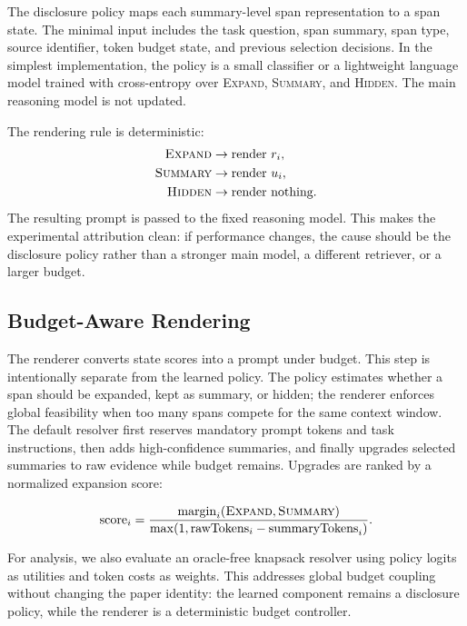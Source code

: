 \documentclass[11pt]{article}
\newcommand{\expandact}{\textsc{Expand}}
\newcommand{\summaryact}{\textsc{Summary}}
\newcommand{\hiddenact}{\textsc{Hidden}}
\begin{document}
The disclosure policy maps each summary-level span representation to a span state. The minimal input includes the task question, span summary, span type, source identifier, token budget state, and previous selection decisions. In the simplest implementation, the policy is a small classifier or a lightweight language model trained with cross-entropy over \expandact{}, \summaryact{}, and \hiddenact{}. The main reasoning model is not updated.

The rendering rule is deterministic:
\begin{align*}
\expandact{} &\rightarrow \text{render } r_i,\\
\summaryact{} &\rightarrow \text{render } u_i,\\
\hiddenact{} &\rightarrow \text{render nothing.}
\end{align*}
The resulting prompt is passed to the fixed reasoning model. This makes the experimental attribution clean: if performance changes, the cause should be the disclosure policy rather than a stronger main model, a different retriever, or a larger budget.

\subsection{Budget-Aware Rendering}

The renderer converts state scores into a prompt under budget. This step is intentionally separate from the learned policy. The policy estimates whether a span should be expanded, kept as summary, or hidden; the renderer enforces global feasibility when too many spans compete for the same context window. The default resolver first reserves mandatory prompt tokens and task instructions, then adds high-confidence summaries, and finally upgrades selected summaries to raw evidence while budget remains. Upgrades are ranked by a normalized expansion score:

\begin{equation}
\mathrm{score}_i =
\frac{\mathrm{margin}_i(\expandact{}, \summaryact{})}
{\max(1, \mathrm{rawTokens}_i - \mathrm{summaryTokens}_i)}.
\end{equation}

For analysis, we also evaluate an oracle-free knapsack resolver using policy logits as utilities and token costs as weights. This addresses global budget coupling without changing the paper identity: the learned component remains a disclosure policy, while the renderer is a deterministic budget controller.
\end{document}
